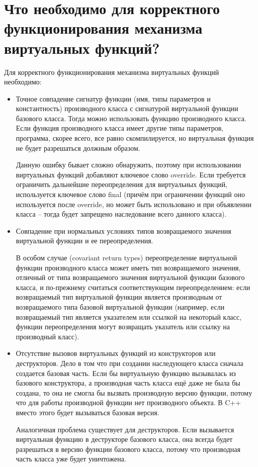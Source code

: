 \documentclass[a4paper,12pt]{article}	%
\begin{document}
	

\newpage

\section{Что необходимо для корректного функционирования механизма виртуальных функций?}
	
	Для корректного функционирования механизма виртуальных функций необходимо:
	
	\begin{itemize}
	
	\item Точное совпадение сигнатур функции (имя, типы параметров и константность) производного класса с сигнатурой виртуальной функции базового класса. Тогда можно использовать функцию производного класса. Если функция производного класса имеет другие типы параметров, программа, скорее всего, все равно скомпилируется, но виртуальная функция не будет разрешаться должным образом.
	
	Данную ошибку бывает сложно обнаружить, поэтому при использовании виртуальных функций добавляют ключевое слово override. Если требуется ограничить дальнейшие переопределения для виртуальных функций, используется ключевое слово final (причём при ограничении функций оно используется после override, но может быть использовано и при объявлении класса -- тогда будет запрещено наследование всего данного класса).
	
	\item Совпадение при нормальных условиях типов возвращаемого значения виртуальной функции и ее переопределения.
	
	В особом случае (covariant return types) переопределение виртуальной функции производного класса может иметь тип возвращаемого значения, отличный от типа возвращаемого  значения виртуальной функции базового класса, и по-прежнему считаться соответствующим переопределением: если возвращаемый тип виртуальной функции является производным от возвращаемого типа базовой виртуальной функции (например, если возвращаемый тип является указателем или ссылкой на некоторый класс, функции переопределения могут возвращать указатель или ссылку на производный класс).
	
	\item Отсутствие вызовов виртуальных функций из конструкторов или деструкторов.	Дело в том что при создании наследующего класса сначала создается базовая часть. Если бы виртуальную функцию вызывалась из базового конструктора, а производная часть класса ещё даже не была бы создана, то она не смогла бы вызвать производную версию функции, потому что для работы производной функции нет производного объекта. В C++ вместо этого будет вызываться базовая версия.

	Аналогичная проблема существует для деструкторов. Если вызывается виртуальная функцию в деструкторе базового класса, она всегда будет разрешаться в версию функции базового класса, потому что производная часть класса уже будет уничтожена.
	
	\end{itemize}
	
\end{document}
